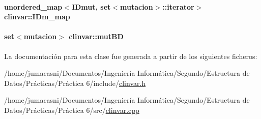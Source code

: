 \paragraph[{\texorpdfstring{I\+Dm\+\_\+map}{IDm_map}}]{\setlength{\rightskip}{0pt plus 5cm}unordered\+\_\+map$<${\bf I\+Dmut}, set$<${\bf mutacion}$>$\+::{\bf iterator}$>$ clinvar\+::\+I\+Dm\+\_\+map\hspace{0.3cm}{\ttfamily [private]}}\hypertarget{classclinvar_ac978af60b36713988bf1d8f5f6cd0e15}{}\label{classclinvar_ac978af60b36713988bf1d8f5f6cd0e15}
\paragraph[{\texorpdfstring{mut\+BD}{mutBD}}]{\setlength{\rightskip}{0pt plus 5cm}set$<${\bf mutacion}$>$ clinvar\+::mut\+BD\hspace{0.3cm}{\ttfamily [private]}}\hypertarget{classclinvar_a7e717fefc1fb718a4b801db416d7df09}{}\label{classclinvar_a7e717fefc1fb718a4b801db416d7df09}


La documentación para esta clase fue generada a partir de los siguientes ficheros\+:\begin{DoxyCompactItemize}
\item 
/home/jumacasni/\+Documentos/\+Ingeniería Informática/\+Segundo/\+Estructura de Datos/\+Prácticas/\+Práctica 6/include/\hyperlink{clinvar_8h}{clinvar.\+h}\item 
/home/jumacasni/\+Documentos/\+Ingeniería Informática/\+Segundo/\+Estructura de Datos/\+Prácticas/\+Práctica 6/src/\hyperlink{clinvar_8cpp}{clinvar.\+cpp}\end{DoxyCompactItemize}
